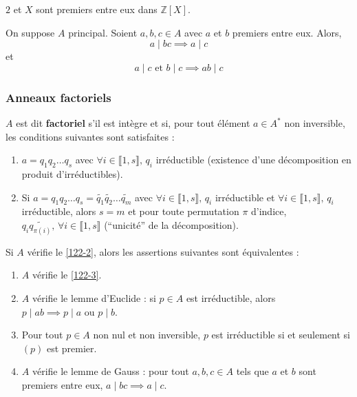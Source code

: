  \begin{example}
    $2$ et $X$ sont premiers entre eux dans $\mathbb{Z}[X]$.
  \end{example}

  \begin{lemma}
    On suppose $A$ principal. Soient $a, b, c \in A$ avec $a$ et $b$ premiers entre eux. Alors,
    \[ a \mid bc \implies a \mid c \]
    et
    \[ a \mid c \text{ et } b \mid c \implies ab \mid c \]
  \end{lemma}

  \subsubsection{Anneaux factoriels}


  \begin{definition}
    $A$ est dit \textbf{factoriel} s'il est intègre et si, pour tout élément $a \in A^*$ non inversible, les conditions suivantes sont satisfaites :
    \begin{enumerate}[label={\bfseries(\roman*)}]
      \item \label{122-2} $a = q_1 q_2 \dots q_s$ avec $\forall i \in \llbracket 1, s \rrbracket, \, q_i$ irréductible (existence d'une décomposition en produit d'irréductibles).
      \item \label{122-3} Si $a = q_1 q_2 \dots q_s = \widetilde{q_1} \widetilde{q_2} \dots \widetilde{q_m}$ avec $\forall i \in \llbracket 1, s \rrbracket, \, q_i$ irréductible et $\forall i \in \llbracket 1, s \rrbracket, \, q_i$ irréductible, alors $s = m$ et pour toute permutation $\pi$ d'indice, $q_i \widetilde{q_{\pi(i)}}, \, \forall i \in \llbracket 1, s \rrbracket$ (``unicité'' de la décomposition).
    \end{enumerate}
  \end{definition}


  \begin{proposition}
    Si $A$ vérifie le \cref{122-2}, alors les assertions suivantes sont équivalentes :
    \begin{enumerate}[label={\bfseries(\roman*)}]
      \item $A$ vérifie le \cref{122-3}.
      \item $A$ vérifie le lemme d'Euclide : si $p \in A$ est irréductible, alors $p \mid ab \implies p \mid a \text { ou } p \mid b$.
      \item Pour tout $p \in A$ non nul et non inversible, $p$ est irréductible si et seulement si $(p)$ est premier.
      \item $A$ vérifie le lemme de Gauss : pour tout $a, b, c \in A$ tels que $a$ et $b$ sont premiers entre eux, $a \mid bc \implies a \mid c$.
    \end{enumerate}
  \end{proposition}

